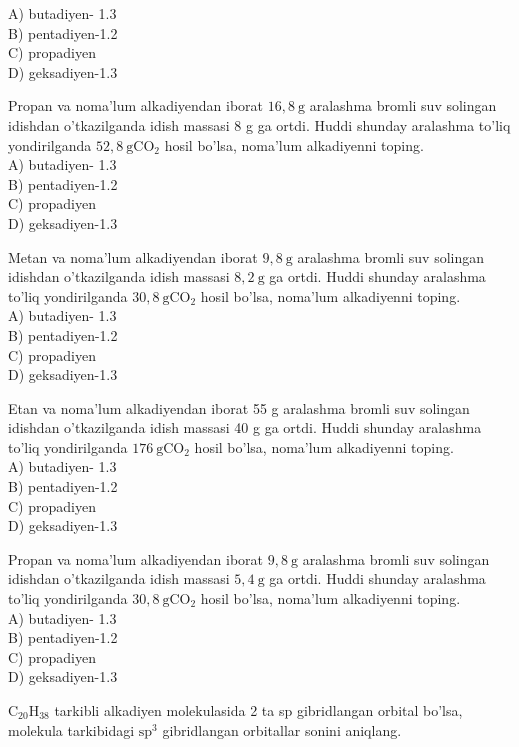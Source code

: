 A) butadiyen- 1.3\\
B) pentadiyen-1.2\\
C) propadiyen\\
D) geksadiyen-1.3
  \item Propan va noma'lum alkadiyendan iborat $16,8 \mathrm{~g}$ aralashma bromli suv solingan idishdan o'tkazilganda idish massasi 8 g ga ortdi. Huddi shunday aralashma to'liq yondirilganda $52,8 \mathrm{~g} \mathrm{CO}_{2}$ hosil bo'lsa, noma'lum alkadiyenni toping.\\
A) butadiyen- 1.3\\
B) pentadiyen-1.2\\
C) propadiyen\\
D) geksadiyen-1.3
  \item Metan va noma'lum alkadiyendan iborat $9,8 \mathrm{~g}$ aralashma bromli suv solingan idishdan o'tkazilganda idish massasi $8,2 \mathrm{~g}$ ga ortdi. Huddi shunday aralashma to'liq yondirilganda $30,8 \mathrm{~g} \mathrm{CO}_{2}$ hosil bo'lsa, noma'lum alkadiyenni toping.\\
A) butadiyen- 1.3\\
B) pentadiyen-1.2\\
C) propadiyen\\
D) geksadiyen-1.3
  \item Etan va noma'lum alkadiyendan iborat 55 g aralashma bromli suv solingan idishdan o'tkazilganda idish massasi 40 g ga ortdi. Huddi shunday aralashma to'liq yondirilganda $176 \mathrm{~g} \mathrm{CO}_{2}$ hosil bo'lsa, noma'lum alkadiyenni toping.\\
A) butadiyen- 1.3\\
B) pentadiyen-1.2\\
C) propadiyen\\
D) geksadiyen-1.3
  \item Propan va noma'lum alkadiyendan iborat $9,8 \mathrm{~g}$ aralashma bromli suv solingan idishdan o'tkazilganda idish massasi $5,4 \mathrm{~g}$ ga ortdi. Huddi shunday aralashma to'liq yondirilganda $30,8 \mathrm{~g} \mathrm{CO}_{2}$ hosil bo'lsa, noma'lum alkadiyenni toping.\\
A) butadiyen- 1.3\\
B) pentadiyen-1.2\\
C) propadiyen\\
D) geksadiyen-1.3
  \item $\mathrm{C}_{20} \mathrm{H}_{38}$ tarkibli alkadiyen molekulasida 2 ta sp gibridlangan orbital bo'lsa, molekula tarkibidagi $\mathrm{sp}^{3}$ gibridlangan orbitallar sonini aniqlang.\\
